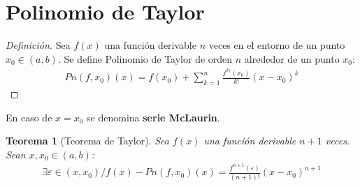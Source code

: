 \documentclass{article}
\newtheorem*{taylor}{Teorema}
\begin{document}
\section{Polinomio de Taylor}
\begin{proof}[Definición]
    Sea $f(x)$ una función derivable $n$ veces en el entorno de un punto $x_{0} \in (a,b)$.
    Se define Polinomio de Taylor de orden $n$ alrededor de un punto $x_{0}$:
    \begin{equation}
        \begin{split}
            Pn(f,x_{0})(x)= f(x_{0}) + \sum _{k=1}^n \frac{f^{k)} (x_{0})}{k!} (x-x_{0})^k
        \end{split}
    \end{equation}
\end{proof}
En caso de $x=x_{0}$ se denomina \textbf{serie McLaurin}.
\begin{taylor}[Teorema de Taylor]
    Sea $f(x)$ una función derivable $n+1$ veces. Sean $x,x_{0} \in  (a,b)$:
    \begin{equation}
        \begin{split}
            \exists \varepsilon \in (x,x_{0}) / f(x)-Pn(f,x_{0})(x)= \frac{f^{n+1}(\varepsilon)}{(n+1)!}(x-x_{0})^{n+1}
        \end{split}
    \end{equation}
\end{taylor}
\end{document}
